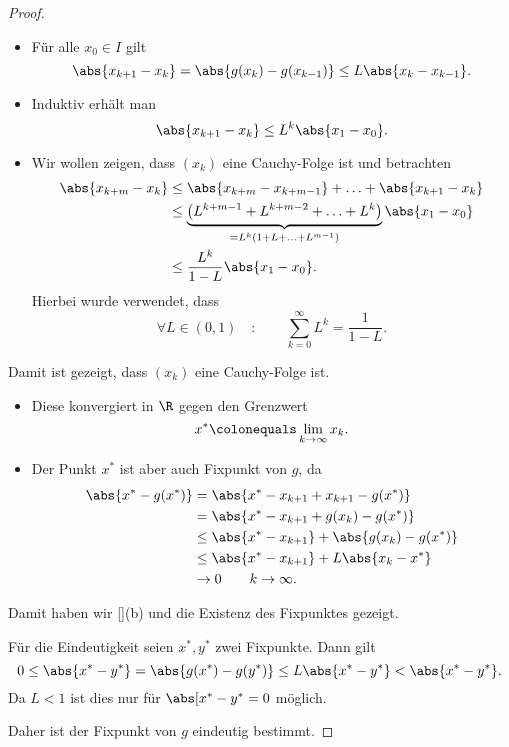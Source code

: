 \begin{proof}
\begin{itemize}
 \item Für alle $x_0 \in I$ gilt
  \begin{equation*}
   \abs{x_{k+1} - x_k} = \abs{g(x_k) -g(x_{k-1})} \leq L \abs{x_k-x_{k-1}}.
  \end{equation*}

 \item Induktiv erhält man
  \begin{equation*}
   \abs{x_{k+1}-x_k} \leq L^k \abs{x_1-x_0}.
  \end{equation*}

 \item Wir wollen zeigen, dass $(x_k )$ eine Cauchy-Folge ist und betrachten
  \begin{align*}
   \abs{x_{k+m} -x_k}
   & \leq
   \abs{x_{k+m}-x_{k+m-1}} + \ldots + \abs{x_{k+1}-x_k} \\
   & \leq
   \underbrace{\left( L^{k+m-1}+L^{k+m-2}+\ldots +L^k \right)}_{=L^k (1+L+\ldots +L^{m-1})} \abs{x_1-x_0} \\
   & \leq
   \frac{L^k}{1-L} \abs{x_1 -x_0}.
  \end{align*}
  Hierbei wurde verwendet, dass
  \begin{equation*}
   \forall L \in (0,1) \quad \colon \qquad \sum_{k=0}^{\infty} L^k=\frac{1}{1-L}.
  \end{equation*}
\end{itemize}
Damit ist gezeigt, dass $(x_k )$ eine Cauchy-Folge ist.

\begin{itemize}
 \item Diese konvergiert in $\R$ gegen den Grenzwert
  \begin{equation*}
   x^* \colonequals \lim_{k \to \infty} x_k.
  \end{equation*}

  \item Der Punkt $x^*$ ist aber auch Fixpunkt von $g$, da
   \begin{align*}
    \abs{x^* -g(x^*)}
    & =
    \abs{x^* -x_{k+1}+x_{k+1}-g(x^*)} \\
    & =
    \abs{x^* -x_{k+1}+g(x_k) - g(x^*)} \\
    & \leq
    \abs{x^* - x_{k+1}} + \abs{g(x_k) - g(x^*)} \\
    & \leq
    \abs{x^* -x_{k+1}} + L \abs{x_k-x^*} \\
    & \to
    0 \qquad k \to \infty.
\end{align*}
\end{itemize}
Damit haben wir \ref{}(b) und die Existenz des Fixpunktes gezeigt.

\medskip

Für die Eindeutigkeit seien $x^*,y^*$ zwei Fixpunkte. Dann gilt
\begin{equation*}
 0 \leq \abs{x^* -y^*} = \abs{g(x^*) - g(y^*)} \leq L \abs{x^* -y^*} < \abs{x^*-y^*}.
\end{equation*}
Da $L<1$ ist dies nur für $\abs[{x^* - y^*}=0$ möglich.

Daher ist der Fixpunkt von $g$ eindeutig bestimmt.
\end{proof}

